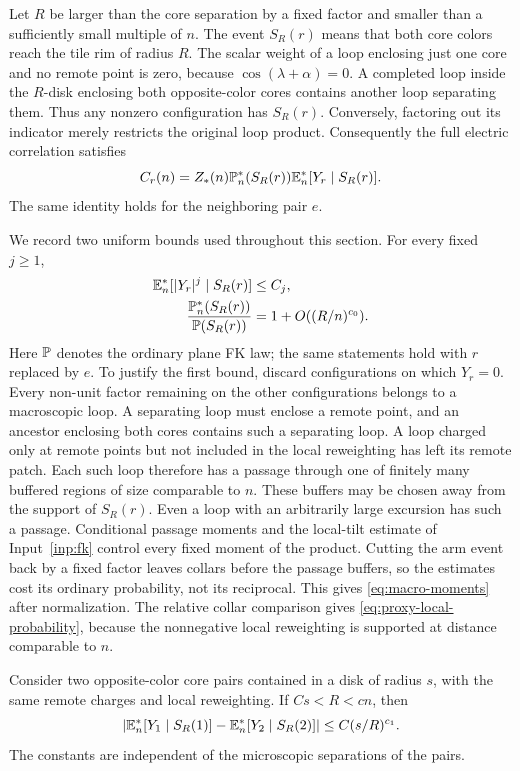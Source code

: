 Let $R$ be larger than the core separation by a fixed factor and
smaller than a sufficiently small multiple of $n$. The event $S_R(r)$
means that both core colors reach the tile rim of radius $R$.
The scalar weight of a loop enclosing just one core and no remote point
is zero, because $\cos(\lambda+\alpha)=0$. A completed loop inside
the $R$-disk enclosing both opposite-color cores contains another
loop separating them. Thus any nonzero configuration has $S_R(r)$.
Conversely, factoring out its indicator merely restricts the original
loop product. Consequently the full electric correlation satisfies
\begin{equation}\label{eq:core-factorization}
 C_r(n)=Z_*(n)\mathbb P_n^*(S_R(r))
             \mathbb E_n^*[Y_r\mid S_R(r)].
\end{equation}
The same identity holds for the neighboring pair $e$.

We record two uniform bounds used throughout this section. For every
fixed $j\ge1$,
\begin{align}
 \mathbb E_n^*[|Y_r|^j\mid S_R(r)]&\le C_j,
 \label{eq:macro-moments}\\
 \frac{\mathbb P_n^*(S_R(r))}{\mathbb P(S_R(r))}
 &=1+O((R/n)^{c_0}).
 \label{eq:proxy-local-probability}
\end{align}
Here $\mathbb P$ denotes the ordinary plane FK law; the same statements hold
with $r$ replaced by $e$. To justify the first bound, discard
configurations on which $Y_r=0$. Every non-unit factor remaining
on the other configurations belongs to a macroscopic loop.
A separating loop must enclose a remote point, and an ancestor
enclosing both cores contains such a separating loop. A loop charged
only at remote points but not included in the local reweighting has
left its remote patch. Each such loop therefore has a passage through
one of finitely many buffered regions of size comparable to $n$.
These buffers may be chosen away from the support of $S_R(r)$.
Even a loop with an arbitrarily large excursion has such a passage.
Conditional passage moments and the local-tilt estimate of
Input~\ref{inp:fk} control every fixed moment of the product.
Cutting the arm event back by a fixed factor leaves collars before
the passage buffers, so the estimates cost its ordinary probability,
not its reciprocal. This gives \eqref{eq:macro-moments} after
normalization. The relative collar comparison gives
\eqref{eq:proxy-local-probability}, because the nonnegative local
reweighting is supported at distance comparable to $n$.

\begin{lemma}\label{lem:signed-comparison}
Consider two opposite-color core pairs contained in a disk of radius
$s$, with the same remote charges and local reweighting. If
$Cs<R<cn$, then
\[
 \left|\mathbb E_n^*[Y_1\mid S_R(1)]-
             \mathbb E_n^*[Y_2\mid S_R(2)]\right|
 \le C(s/R)^{c_1}.
\]
The constants are independent of the microscopic separations of the
pairs.
\end{lemma}

